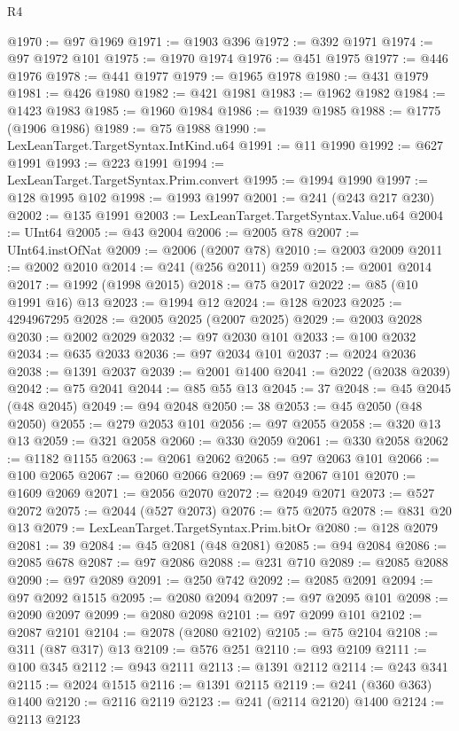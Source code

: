 \begin{lexlean}{R4}
\begin{coremodule}
@1970 := @97 @1969
@1971 := @1903 @396
@1972 := @392 @1971
@1974 := @97 @1972 @101
@1975 := @1970 @1974
@1976 := @451 @1975
@1977 := @446 @1976
@1978 := @441 @1977
@1979 := @1965 @1978
@1980 := @431 @1979
@1981 := @426 @1980
@1982 := @421 @1981
@1983 := @1962 @1982
@1984 := @1423 @1983
@1985 := @1960 @1984
@1986 := @1939 @1985
@1988 := @1775 (@1906 @1986)
@1989 := @75 @1988
@1990 := LexLeanTarget.TargetSyntax.IntKind.u64
@1991 := @11 @1990
@1992 := @627 @1991
@1993 := @223 @1991
@1994 := LexLeanTarget.TargetSyntax.Prim.convert
@1995 := @1994 @1990
@1997 := @128 @1995 @102
@1998 := @1993 @1997
@2001 := @241 (@243 @217 @230)
@2002 := @135 @1991
@2003 := LexLeanTarget.TargetSyntax.Value.u64
@2004 := UInt64
@2005 := @43 @2004
@2006 := @2005 @78
@2007 := UInt64.instOfNat
@2009 := @2006 (@2007 @78)
@2010 := @2003 @2009
@2011 := @2002 @2010
@2014 := @241 (@256 @2011) @259
@2015 := @2001 @2014
@2017 := @1992 (@1998 @2015)
@2018 := @75 @2017
@2022 := @85 (@10 @1991 @16) @13
@2023 := @1994 @12
@2024 := @128 @2023
@2025 := 4294967295
@2028 := @2005 @2025 (@2007 @2025)
@2029 := @2003 @2028
@2030 := @2002 @2029
@2032 := @97 @2030 @101
@2033 := @100 @2032
@2034 := @635 @2033
@2036 := @97 @2034 @101
@2037 := @2024 @2036
@2038 := @1391 @2037
@2039 := @2001 @1400
@2041 := @2022 (@2038 @2039)
@2042 := @75 @2041
@2044 := @85 @55 @13
@2045 := 37
@2048 := @45 @2045 (@48 @2045)
@2049 := @94 @2048
@2050 := 38
@2053 := @45 @2050 (@48 @2050)
@2055 := @279 @2053 @101
@2056 := @97 @2055
@2058 := @320 @13 @13
@2059 := @321 @2058
@2060 := @330 @2059
@2061 := @330 @2058
@2062 := @1182 @1155
@2063 := @2061 @2062
@2065 := @97 @2063 @101
@2066 := @100 @2065
@2067 := @2060 @2066
@2069 := @97 @2067 @101
@2070 := @1609 @2069
@2071 := @2056 @2070
@2072 := @2049 @2071
@2073 := @527 @2072
@2075 := @2044 (@527 @2073)
@2076 := @75 @2075
@2078 := @831 @20 @13
@2079 := LexLeanTarget.TargetSyntax.Prim.bitOr
@2080 := @128 @2079
@2081 := 39
@2084 := @45 @2081 (@48 @2081)
@2085 := @94 @2084
@2086 := @2085 @678
@2087 := @97 @2086
@2088 := @231 @710
@2089 := @2085 @2088
@2090 := @97 @2089
@2091 := @250 @742
@2092 := @2085 @2091
@2094 := @97 @2092 @1515
@2095 := @2080 @2094
@2097 := @97 @2095 @101
@2098 := @2090 @2097
@2099 := @2080 @2098
@2101 := @97 @2099 @101
@2102 := @2087 @2101
@2104 := @2078 (@2080 @2102)
@2105 := @75 @2104
@2108 := @311 (@87 @317) @13
@2109 := @576 @251
@2110 := @93 @2109
@2111 := @100 @345
@2112 := @943 @2111
@2113 := @1391 @2112
@2114 := @243 @341
@2115 := @2024 @1515
@2116 := @1391 @2115
@2119 := @241 (@360 @363) @1400
@2120 := @2116 @2119
@2123 := @241 (@2114 @2120) @1400
@2124 := @2113 @2123

\end{coremodule}
\end{lexlean}
